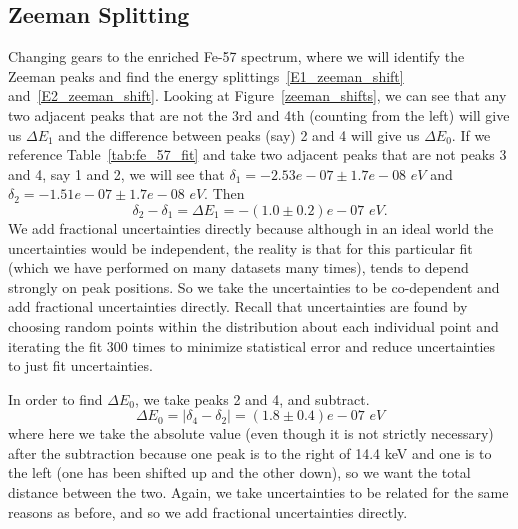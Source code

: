 \documentclass[reprint, nobibnotes, amssymb, amsmath, amsfonts, mathtools, mathrsfs, floatfix]{revtex4-1}
\begin{document}
    \subsection{Zeeman Splitting}
      Changing gears to the enriched Fe-57 spectrum, where we will identify the Zeeman peaks and find the energy splittings~\ref{E1_zeeman_shift} and~\ref{E2_zeeman_shift}.  Looking at Figure~\ref{zeeman_shifts}, we can see that any two adjacent peaks that are not the 3rd and 4th (counting from the left) will give us $\Delta E_1$ and the difference between peaks (say) 2 and 4 will give us $\Delta E_0$.  If we reference Table~\ref{tab:fe_57_fit} and take two adjacent peaks that are not peaks 3 and 4, say 1 and 2, we will see that $\delta_1 = -2.53e-07 \pm 1.7e-08 \,\, eV$ and $\delta_2 = -1.51e-07 \pm 1.7e-08 \,\, eV$.  Then
      \begin{equation}
        \delta_2 - \delta_1 = \Delta E_1 = -(1.0\pm0.2)e-07 \,\, eV.
      \end{equation}
      We add fractional uncertainties directly because although in an ideal world the uncertainties would be independent, the reality is that for this particular fit (which we have performed on many datasets many times), tends to depend strongly on peak positions.  So we take the uncertainties to be co-dependent and add fractional uncertainties directly.  Recall that uncertainties are found by choosing random points within the distribution about each individual point and iterating the fit 300 times to minimize statistical error and reduce uncertainties to just fit uncertainties.

      In order to find $\Delta E_0$, we take peaks 2 and 4, and subtract.
      \begin{equation}
        \Delta E_0 = |\delta_4 - \delta_2| = (1.8\pm0.4)e-07 \,\, eV
      \end{equation}
      where here we take the absolute value (even though it is not strictly necessary) after the subtraction because one peak is to the right of 14.4 keV and one is to the left (one has been shifted up and the other down), so we want the total distance between the two.  Again, we take uncertainties to be related for the same reasons as before, and so we add fractional uncertainties directly.
\end{document}
